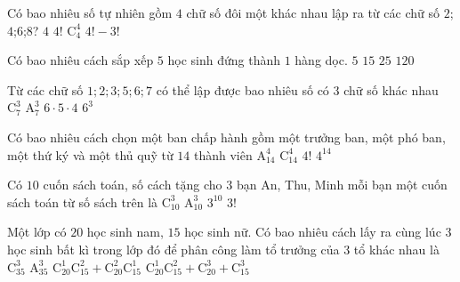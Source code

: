 \begin{ex}%
	Có bao nhiêu số tự nhiên gồm $4$ chữ số đôi một khác nhau lập ra từ các chữ số $2$;$4$;$6$;$8$?
	\choice
	{ $4$}
	{\True $4!$}
	{ $\mathrm{C}_4^4$}
	{ $4!-3!$}
\end{ex}
\begin{ex}%
	Có bao nhiêu cách sắp xếp $5$ học sinh đứng thành $1$ hàng dọc.
	\choice
	{ $5$}
	{ $15$}
	{ $25$}
	{\True $120$}
\end{ex}
\begin{ex}%
	Từ các chữ số $1;2;3;5;6;7$ có thể lập được bao nhiêu số có 3 chữ số khác nhau
	\choice
	{ $\mathrm{C}_7^3$}
	{ $\mathrm{A}_7^3$}
	{\True $6\cdot5\cdot4$}
	{ $6^3$}
\end{ex}
\begin{ex}%
	Có bao nhiêu cách chọn một ban chấp hành gồm một trưởng ban, một phó ban, một thứ ký và một thủ quỹ từ $14$ thành viên
	\choice
	{\True $\mathrm{A}_{14}^4$}
	{ $\mathrm{C}_{14}^4$}
	{ $4!$}
	{ ${4^{14}}$}
\end{ex}
\begin{ex}%
	Có $10$ cuốn sách toán, số cách tặng cho $3$ bạn An, Thu, Minh mỗi bạn một cuốn sách toán từ số sách trên là
	\choice
	{ $\mathrm{C}_{10}^3$}
	{\True $\mathrm{A}_{10}^3$}
	{ ${3^{10}}$}
	{ $3!$}
\end{ex}
\begin{ex}%
	Một lớp có $20$ học sinh nam, $15$ học sinh nữ. Có bao nhiêu cách lấy ra cùng lúc $3$ học sinh bất kì trong lớp đó để phân công làm tổ trưởng của $3$ tổ khác nhau là
	\choice
	{ $\mathrm{C}_{35}^3$}
	{\True $\mathrm{A}_{35}^3$}
	{ $\mathrm{C}_{20}^1\mathrm{C}_{15}^2+\mathrm{C}_{20}^2\mathrm{C}_{15}^1$}
	{ $\mathrm{C}_{20}^1\mathrm{C}_{15}^2+\mathrm{C}_{20}^3+\mathrm{C}_{15}^3$}
\end{ex}
